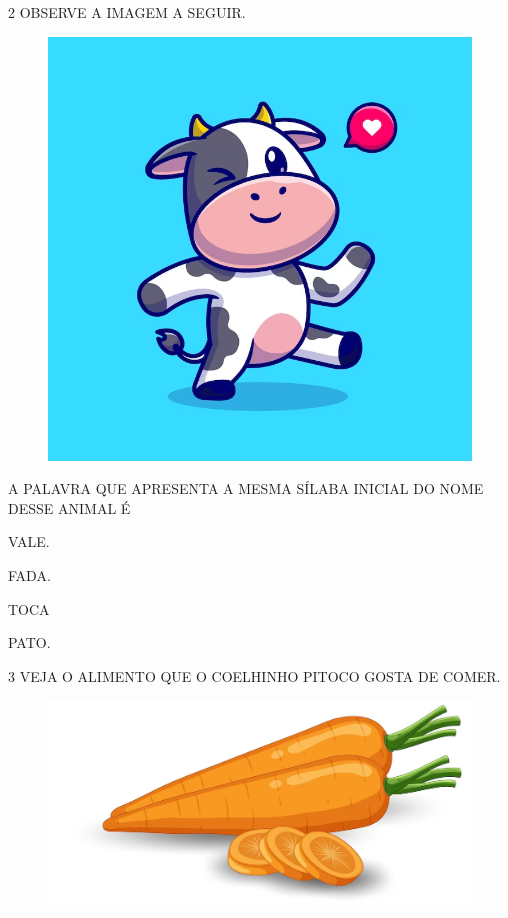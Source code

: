 \num{2} OBSERVE A IMAGEM A SEGUIR.

\begin{figure}[H]
\centering
\includegraphics[width=\textwidth]{./media/image222.png}
\end{figure}

A PALAVRA QUE APRESENTA A MESMA SÍLABA INICIAL DO NOME DESSE ANIMAL É

\begin{escolha}
\item VALE.

\item FADA.

\item TOCA

\item PATO.

\end{escolha}

\num{3} VEJA O ALIMENTO QUE O COELHINHO PITOCO GOSTA DE COMER.

\begin{figure}[H]
\centering
\includegraphics[width=\textwidth]{./media/image223.png}
\end{figure}

